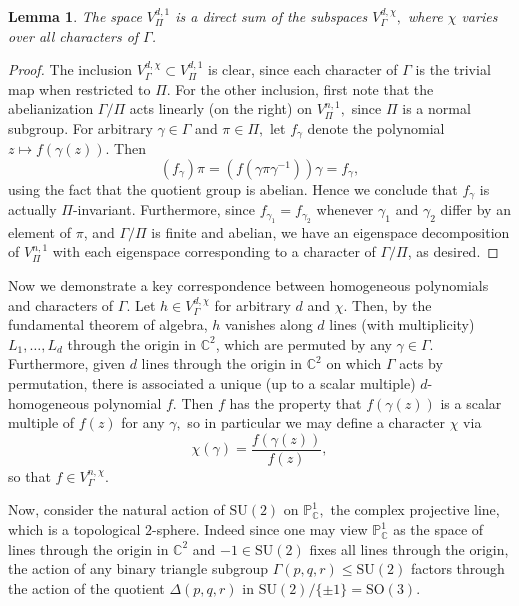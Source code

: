 \documentclass{article}
\newtheorem{lemma}{Lemma}[section]
\begin{document}
 \begin{lemma}
 \label{4.1}
 The space $V_\Pi^{d,1}$ is a direct sum of the subspaces $V_\Gamma^{d,\chi},$ where $\chi$ varies over all characters of $\Gamma$. 
 \end{lemma}
\begin{proof}
 The inclusion $V_\Gamma^{d,\chi} \subset V_\Pi^{d,1}$ is clear, since each character of $\Gamma$ is the trivial map when restricted to $\Pi$. For the other inclusion, first note that the abelianization $\Gamma/\Pi$ acts linearly (on the right) on $V_{\Pi}^{n,1},$ since $\Pi$ is a normal subgroup. For arbitrary $\gamma \in \Gamma$ and $\pi \in \Pi,$ let $f_\gamma$ denote the polynomial $z \mapsto f(\gamma(z))$. Then
 \[(f_\gamma)\pi = (f(\gamma \pi \gamma^{-1}))\gamma = f_\gamma,\]
 using the fact that the quotient group is abelian. Hence we conclude that $f_\gamma$ is actually $\Pi$-invariant. Furthermore, since $f_{\gamma_1} = f_{\gamma_2}$ whenever $\gamma_1$ and $\gamma_2$ differ by an element of $\pi$, and $\Gamma/\Pi$ is finite and abelian, we have an eigenspace decomposition of $V_{\Pi}^{n,1}$ with each eigenspace corresponding to a character of $\Gamma/\Pi$, as desired.
\end{proof}
Now we demonstrate a key correspondence between homogeneous polynomials and characters of $\Gamma$. Let $h \in V^{d, \chi}_\Gamma$ for arbitrary $d$ and $\chi$. Then, by the fundamental theorem of algebra, $h$ vanishes along $d$ lines (with multiplicity) $L_1, \dots, L_d$ through the origin in $\mathbb{C}^2$, which are permuted by any $\gamma \in \Gamma.$ Furthermore, given $d$ lines through the origin in $\mathbb{C}^2$ on which $\Gamma$ acts by permutation, there is associated a unique (up to a scalar multiple) $d$-homogeneous polynomial $f$. Then $f$ has the property that $f(\gamma(z))$ is a scalar multiple of $f(z)$ for any $\gamma,$ so in particular we may define a character $\chi$ via
\[\chi(\gamma) = \frac{f(\gamma(z))}{f(z)},\]
so that $f \in V^{n, \chi}_\Gamma.$ 

Now, consider the natural action of $\mathrm{SU}(2)$ on $\mathbb{P}_\mathbb{C}^1,$ the complex projective line, which is a topological $2$-sphere. Indeed since one may view $\mathbb{P}_{\mathbb{C}}^1$ as the space of lines through the origin in $\mathbb{C}^2$ and $-1 \in \mathrm{SU(2)}$ fixes all lines through the origin, the action of any binary triangle subgroup $\Gamma(p,q,r) \leq \mathrm{SU}(2)$ factors through the action of the quotient $\Delta(p,q,r)$ in $\mathrm{SU}(2)/\{\pm 1\} = \mathrm{SO}(3).$ 
\end{document}
